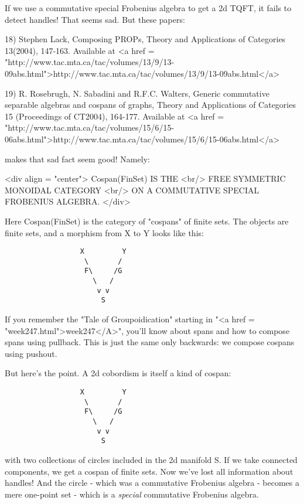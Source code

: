 If we use a commutative special Frobenius algebra to get a 2d TQFT, 
it fails to detect handles!  That seems sad.  But these papers:

18) Stephen Lack, Composing PROPs, Theory and Applications of
Categories 13(2004), 147-163.  Available at <a href = "http://www.tac.mta.ca/tac/volumes/13/9/13-09abs.html">http://www.tac.mta.ca/tac/volumes/13/9/13-09abs.html</a>

19) R. Rosebrugh, N. Sabadini and R.F.C. Walters, Generic commutative 
separable algebras and cospans of graphs, Theory and Applications of 
Categories 15 (Proceedings of CT2004), 164-177.  Available at
<a href = "http://www.tac.mta.ca/tac/volumes/15/6/15-06abs.html">http://www.tac.mta.ca/tac/volumes/15/6/15-06abs.html</a>

makes that sad fact seem good!  Namely:

<div align = "center">
      Cospan(FinSet) IS THE <br/> 
      FREE SYMMETRIC MONOIDAL CATEGORY <br/>
           ON A COMMUTATIVE SPECIAL FROBENIUS ALGEBRA.
</div>

Here Cospan(FinSet) is the category of "cospans" of finite sets.
The objects are finite sets, and a morphism from X to Y looks like
this:

\begin{verbatim}
                  X         Y
                   \       /
                   F\     /G
                     \   /
                      v v
                       S
\end{verbatim}
    

If you remember the "Tale of Groupoidication" starting in
"<a href = "week247.html">week247</A>", you'll know about
spans and how to compose spans using pullback.  This is just the same
only backwards: we compose cospans using pushout.

But here's the point.  A 2d cobordism is itself a kind of cospan:

\begin{verbatim}
                  X         Y
                   \       /
                   F\     /G
                     \   /
                      v v
                       S
\end{verbatim}
    
with two collections of circles included in the 2d manifold S.  If we 
take connected components, we get a cospan of finite sets.  Now we've
lost all information about handles!  And the circle - which was a 
commutative Frobenius algebra - becomes a mere one-point set - which 
is a \emph{special} commutative Frobenius algebra.  

